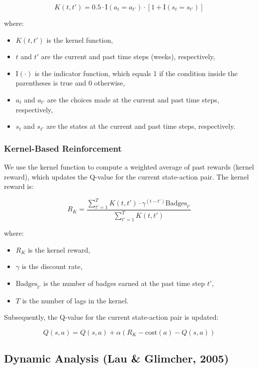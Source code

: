 \documentclass[
  number,
  preprint,
  3p,
  onecolumn]{elsarticle}
\providecommand{\tightlist}{%
  \setlength{\itemsep}{0pt}\setlength{\parskip}{0pt}}\usepackage{longtable,booktabs,array}
\begin{document}
\[
K(t, t') = 0.5 \cdot \text{I}(a_t = a_{t'}) \cdot \left[ 1 + \text{I}(s_t = s_{t'})\right]
\]

where:

\begin{itemize}
\tightlist
\item
  \(K(t, t')\) is the kernel function,
\item
  \(t\) and \(t'\) are the current and past time steps (weeks),
  respectively,
\item
  \(\text{I}(\cdot)\) is the indicator function, which equals 1 if the
  condition inside the parentheses is true and 0 otherwise,
\item
  \(a_t\) and \(a_{t'}\) are the choices made at the current and past
  time steps, respectively,
\item
  \(s_t\) and \(s_{t'}\) are the states at the current and past time
  steps, respectively.
\end{itemize}

\hypertarget{kernel-based-reinforcement}{%
\subsubsection{Kernel-Based
Reinforcement}\label{kernel-based-reinforcement}}

We use the kernel function to compute a weighted average of past rewards
(kernel reward), which updates the Q-value for the current state-action
pair. The kernel reward is:

\[
R_K = \frac{\sum_{t' = 1}^{T} K(t, t') \cdot \gamma^{(t - t')}  \text{Badges}_{t'}}{\sum_{t' = 1}^{T} K(t, t')}
\]

where:

\begin{itemize}
\tightlist
\item
  \(R_K\) is the kernel reward,
\item
  \(\gamma\) is the discount rate,
\item
  \(\text{Badges}_{t'}\) is the number of badges earned at the past time
  step \(t'\),
\item
  \(T\) is the number of lags in the kernel.
\end{itemize}

Subsequently, the Q-value for the current state-action pair is updated:

\[
Q(s, a) = Q(s, a) + \alpha \left( R_K - \text{cost}(a) - Q(s, a) \right)
\]

\hypertarget{dynamic-analysis-lau-glimcher-2005}{%
\subsection{Dynamic Analysis (Lau \& Glimcher,
2005)}\label{dynamic-analysis-lau-glimcher-2005}}
\end{document}
